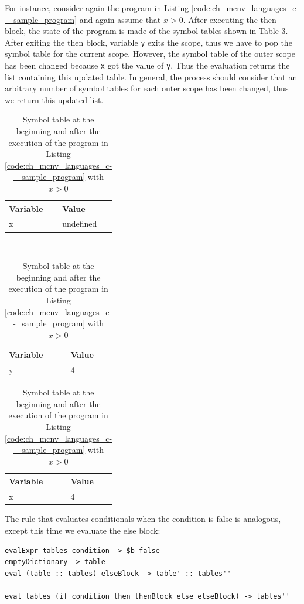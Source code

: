 For instance, consider again the program in Listing \ref{code:ch_mcnv_languages_c--_sample_program} and again assume that $x > 0$. After executing the then block, the state of the program is made of the symbol tables shown in Table \ref{tab:ch_mcnv_languages_tables_ifthenelse}. After exiting the then block, variable \texttt{y} exits the scope, thus we have to pop the symbol table for the current scope. However, the symbol table of the outer scope has been changed because \texttt{x} got the value of \texttt{y}. Thus the evaluation returns the list containing this updated table. In general, the process should consider that an arbitrary number of symbol tables for each outer scope has been changed, thus we return this updated list.

\begin{table}
	\centering
	\begin{tabular}{|l|l|}
		\hline
		\textbf{Variable} & \textbf{Value} \\
		\hline
		x & undefined\\
		\hline
	\end{tabular}\\
	\vspace{0.2cm}
	\begin{tabular}{|l|l|}
		\hline
		\textbf{Variable} & \textbf{Value} \\
		\hline
		y & 4\\
		\hline
	\end{tabular}
	\begin{tabular}{|l|l|}
		\hline
		\textbf{Variable} & \textbf{Value} \\
		\hline
		x & 4\\
		\hline
	\end{tabular}
	\caption{Symbol table at the beginning and after the execution of the program in Listing \ref{code:ch_mcnv_languages_c--_sample_program} with $x > 0$}
	\label{tab:ch_mcnv_languages_tables_ifthenelse}
\end{table}

The rule that evaluates conditionals when the condition is false is analogous, except this time we evaluate the else block:

\begin{lstlisting}
evalExpr tables condition -> $b false
emptyDictionary -> table
eval (table :: tables) elseBlock -> table' :: tables''
--------------------------------------------------------------------
eval tables (if condition then thenBlock else elseBlock) -> tables''
\end{lstlisting}

